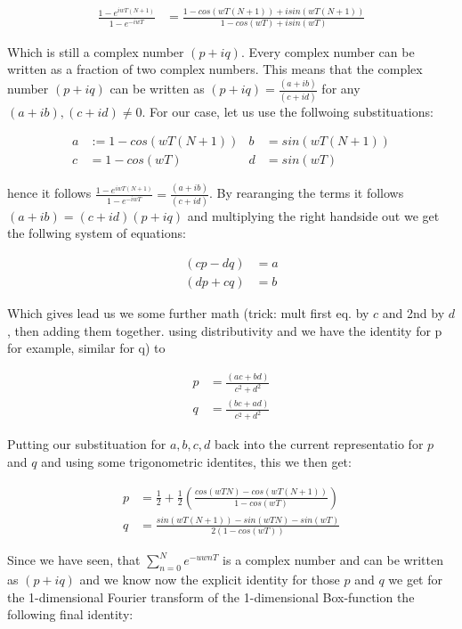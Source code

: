 \begin{align*}
\frac{1-e^{iwT(N+1)}}{1-e^{-iwT}}
& =\frac{1-cos(wT(N+1)) + i sin(wT(N+1)) }{1-cos(wT) + i sin(wT)}
\end{align*}

Which is still a complex number $(p+iq)$. Every complex number can be written as a fraction of two complex numbers. This means that the complex number $(p+iq)$ can be written as $(p+iq) = \frac{(a+ib)}{(c+id)}$ for any $(a+ib), (c+id) \neq 0$. 
For our case, let us use the follwoing substituations: 

\begin{align}
a& := 1 - cos(wT(N+1))&
b& =sin(wT(N+1))\\
c& =1-cos(wT)&
d& =sin(wT)
\end{align}

hence it follows $\frac{1-e^{iwT(N+1)}}{1-e^{-iwT}} = \frac{(a+ib)}{(c+id)}$.
By rearanging the terms it follows $(a+ib) = (c+id)(p+iq)$ and multiplying the right handside out we get the follwing system of equations:

\begin{align}
(cp-dq)& =a\\
(dp + cq)& =b
\end{align}

Which gives lead us we some further math (trick: mult first eq. by $c$ and 2nd by $d$, then adding them together. using distributivity and we have the identity for p for example, similar for q) to 

\begin{align}
p& =\frac{(ac+bd)}{c^2 + d^2}\\
q& =\frac{(bc+ad)}{c^2 + d^2}
\end{align}


Putting our substituation for $a, b, c, d$ back into the current representatio for $p$ and $q$ and using some trigonometric identites, this we then get:

\begin{align}
p& =\frac{1}{2}+\frac{1}{2}\left(\frac{cos(wTN)-cos(wT(N+1))}{1-cos(wT)}\right)\\
q& =\frac{sin(wT(N+1))-sin(wTN)-sin(wT)}{2(1-cos(wT))}
\end{align}

Since we have seen, that $\sum_{n=0}^N e^{-uwnT}$ is a complex number and can be written as $(p+iq)$ and we know now the explicit identity for those $p$ and $q$ we get for the 1-dimensional Fourier transform of the 1-dimensional Box-function the following final identity:

